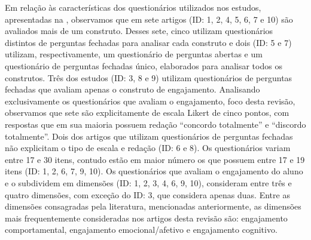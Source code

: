 \documentclass[portuguese]{textolivre}
\begin{document}
Em relação às características dos questionários utilizados nos estudos, apresentadas na , observamos que em sete artigos (ID: 1, 2, 4, 5, 6, 7 e 10) são avaliados mais de um construto. Desses sete, cinco utilizam questionários distintos de perguntas fechadas para analisar cada construto e dois (ID: 5 e 7) utilizam, respectivamente, um questionário de perguntas abertas e um questionário de perguntas fechadas único, elaborados para analisar todos os construtos. Três dos estudos (ID: 3, 8 e 9) utilizam questionários de perguntas fechadas que avaliam apenas o construto de engajamento. Analisando exclusivamente os questionários que avaliam o engajamento, foco desta revisão, observamos que sete são explicitamente de escala Likert de cinco pontos, com respostas que em sua maioria possuem redação “concordo totalmente” e “discordo totalmente”. Dois dos artigos que utilizam questionários de perguntas fechadas não explicitam o tipo de escala e redação (ID: 6 e 8). Os questionários variam entre 17 e 30 itens, contudo estão em maior número os que possuem entre 17 e 19 itens (ID: 1, 2, 6, 7, 9, 10). Os questionários que avaliam o engajamento do aluno e o subdividem em dimensões (ID: 1, 2, 3, 4, 6, 9, 10), consideram entre três e quatro dimensões, com exceção do ID: 3, que considera apenas duas. Entre as dimensões consagradas pela literatura, mencionadas anteriormente, as dimensões mais frequentemente consideradas nos artigos desta revisão são: engajamento comportamental, engajamento emocional/afetivo e engajamento cognitivo.
\end{document}
